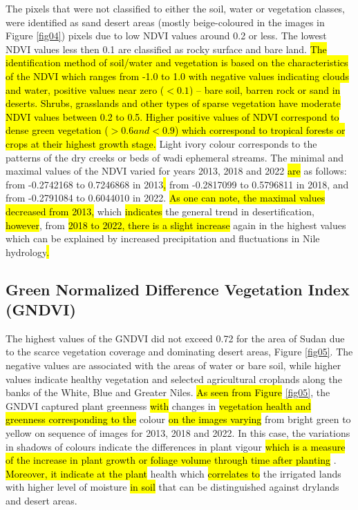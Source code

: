 \documentclass[jimaging,article,submit,pdftex,moreauthors]{Definitions/mdpi}
\begin{document}
The pixels that were not classified to either the soil, water or vegetation classes, were identified as sand desert areas (mostly beige-coloured in the images in Figure \ref{fig04}) pixels due to low NDVI values around 0.2 or less. The lowest NDVI values less then 0.1 are classified as rocky surface and bare land. \hl{The identification method of soil/water and vegetation is based on the characteristics of the NDVI which ranges from -1.0 to 1.0 with negative values indicating clouds and water, positive values near zero ($<0.1$) -- bare soil, barren rock or sand in deserts. Shrubs, grasslands and other types of sparse vegetation have moderate NDVI values between 0.2 to 0.5. Higher positive values of NDVI correspond to dense green vegetation ($>0.6 and <0.9$) which correspond to tropical forests or crops at their highest growth stage.} Light ivory colour corresponds to the patterns of the dry creeks or beds of wadi ephemeral streams. The minimal and maximal values of the NDVI varied for years 2013, 2018 and 2022 \hl{are }as follows: from -0.2742168 to 0.7246868 in 2013\hl{, }from -0.2817099 to 0.5796811 in 2018, and from -0.2791084 to 0.6044010 in 2022. \hl{As one can note, the maximal values decreased from 2013, }which \hl{indicates} the general trend in desertification, \hl{however}, from \hl{2018 to 2022, there is a slight increase} again in the highest values which can be explained by increased precipitation and fluctuations in Nile hydrology\hl{. }

\subsection{Green Normalized Difference Vegetation Index (GNDVI)}

The highest values of the GNDVI did not exceed 0.72 for the area of Sudan due to the scarce vegetation coverage and dominating desert areas, Figure \ref{fig05}. The negative values are associated with the areas of water or bare soil, while higher values indicate healthy vegetation and selected agricultural croplands along the banks of the White, Blue and Greater Niles. \hl{As seen from Figure} \ref{fig05}, the GNDVI captured plant greenness \hl{with} changes in \hl{vegetation health and greenness corresponding to the }colour \hl{on the images varying }from bright green to yellow on sequence of images for 2013, 2018 and 2022. In this case, the variations in shadows of colours indicate the differences in plant vigour \hl{which is a measure of the increase in plant growth or foliage volume through time after planting} \cite{Dictionary}. \hl{Moreover, it indicate at the plant }health which \hl{correlates to} the irrigated lands with higher level of moisture \hl{in soil }that can be distinguished against drylands and desert areas. 
\end{document}

